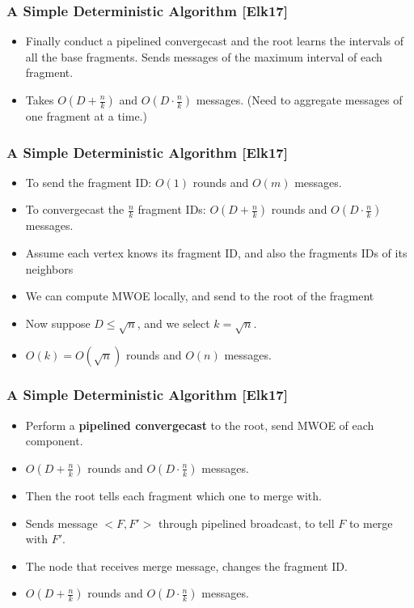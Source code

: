 \begin{frame}
\frametitle{A Simple Deterministic Algorithm [Elk17]}
\begin{itemize}
    \item Finally conduct a pipelined convergecast and the root learns the intervals of all the base fragments. Sends messages of the maximum interval of each fragment.
    \item Takes $O(D+\frac{n}{k})$ and $O(D \cdot \frac{n}{k})$ messages. (Need to aggregate messages of one fragment at a time.)
\end{itemize}
\end{frame}

\begin{frame}
\frametitle{A Simple Deterministic Algorithm [Elk17]}
\begin{itemize}
    \item To send the fragment ID: $O(1)$ rounds and $O(m)$ messages.
    \item To convergecast the $\frac{n}{k}$ fragment IDs: $O(D+\frac{n}{k})$ rounds and $O(D \cdot\frac{n}{k})$ messages.
    \item Assume each vertex knows its fragment ID, and also the fragments IDs of its neighbors
    \item We can compute MWOE locally, and send to the root of the fragment
    \item Now suppose $D \le \sqrt{n}$, and we select $k=\sqrt{n}$.
    \item $O(k)=O(\sqrt{n})$ rounds and $O(n)$ messages.
\end{itemize}
\end{frame}

\begin{frame}
\frametitle{A Simple Deterministic Algorithm [Elk17]}
\begin{itemize}
    \item Perform a \textbf{pipelined convergecast} to the root, send MWOE of each component.
    \item $O(D+\frac{n}{k})$ rounds and $O(D \cdot \frac{n}{k})$ messages.
    \item Then the root tells each fragment which one to merge with.
    \item Sends message $<F,F'>$ through pipelined broadcast, to tell $F$ to merge with $F'$.
    \item The node that receives merge message, changes the fragment ID.
    \item $O(D+\frac{n}{k})$ rounds and $O(D \cdot \frac{n}{k})$ messages.
\end{itemize}
\end{frame}

